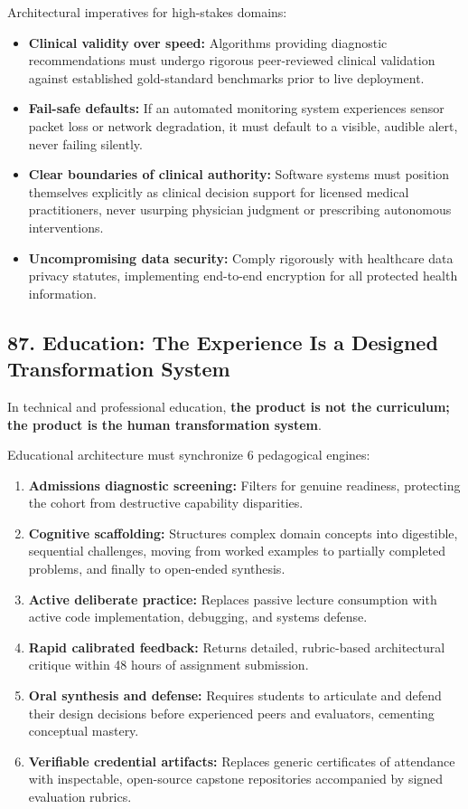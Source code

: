Architectural imperatives for high-stakes domains:
\begin{itemize}
    \item \textbf{Clinical validity over speed:} Algorithms providing diagnostic recommendations must undergo rigorous peer-reviewed clinical validation against established gold-standard benchmarks prior to live deployment.
    \item \textbf{Fail-safe defaults:} If an automated monitoring system experiences sensor packet loss or network degradation, it must default to a visible, audible alert, never failing silently.
    \item \textbf{Clear boundaries of clinical authority:} Software systems must position themselves explicitly as clinical decision support for licensed medical practitioners, never usurping physician judgment or prescribing autonomous interventions.
    \item \textbf{Uncompromising data security:} Comply rigorously with healthcare data privacy statutes, implementing end-to-end encryption for all protected health information.
\end{itemize}

\subsection*{87. Education: The Experience Is a Designed Transformation System}

In technical and professional education, \textbf{the product is not the curriculum; the product is the human transformation system}.

Educational architecture must synchronize 6 pedagogical engines:
\begin{enumerate}
    \item \textbf{Admissions diagnostic screening:} Filters for genuine readiness, protecting the cohort from destructive capability disparities.
    \item \textbf{Cognitive scaffolding:} Structures complex domain concepts into digestible, sequential challenges, moving from worked examples to partially completed problems, and finally to open-ended synthesis.
    \item \textbf{Active deliberate practice:} Replaces passive lecture consumption with active code implementation, debugging, and systems defense.
    \item \textbf{Rapid calibrated feedback:} Returns detailed, rubric-based architectural critique within 48 hours of assignment submission.
    \item \textbf{Oral synthesis and defense:} Requires students to articulate and defend their design decisions before experienced peers and evaluators, cementing conceptual mastery.
    \item \textbf{Verifiable credential artifacts:} Replaces generic certificates of attendance with inspectable, open-source capstone repositories accompanied by signed evaluation rubrics.
\end{enumerate}

